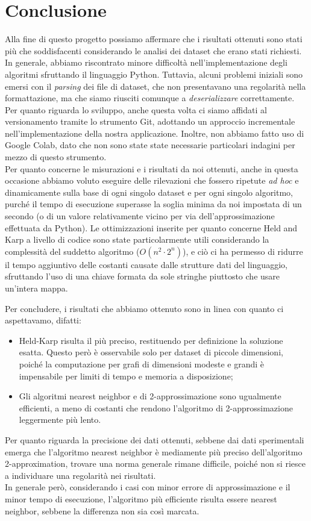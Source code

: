 \section{Conclusione}

Alla fine di questo progetto possiamo affermare che i risultati ottenuti sono stati più che soddisfacenti considerando le analisi dei dataset che erano stati richiesti. In generale, abbiamo riscontrato minore difficoltà nell'implementazione degli algoritmi sfruttando il linguaggio Python. Tuttavia, alcuni problemi iniziali sono emersi con il \textit{parsing} dei file di dataset, che non presentavano una regolarità nella formattazione, ma che siamo riusciti comunque a \textit{deserializzare} correttamente. \\ %
Per quanto riguarda lo sviluppo, anche questa volta ci siamo affidati al versionamento tramite lo strumento Git, adottando un approccio incrementale nell'implementazione della nostra applicazione. Inoltre, non abbiamo fatto uso di Google Colab, dato che non sono state state necessarie particolari indagini per mezzo di questo strumento. \\
Per quanto concerne le misurazioni e i risultati da noi ottenuti, anche in questa occasione abbiamo voluto eseguire delle rilevazioni che fossero ripetute \textit{ad hoc} e dinamicamente sulla base di ogni singolo dataset e per ogni singolo algoritmo, purché il tempo di esecuzione superasse la soglia minima da noi impostata di un secondo (o di un valore relativamente vicino per via dell'approssimazione effettuata da Python).
Le ottimizzazioni inserite per quanto concerne Held and Karp a livello di codice sono state particolarmente utili considerando la complessità del suddetto algoritmo (\(O(n^2\cdot2^n)\)), e ciò ci ha permesso di ridurre il tempo aggiuntivo delle costanti causate dalle strutture dati del linguaggio, sfruttando l'uso di una chiave formata da sole stringhe piuttosto che usare un'intera mappa. 

\noindent Per concludere, i risultati che abbiamo ottenuto sono in linea con quanto ci aspettavamo, difatti:
\begin{itemize}
  \item Held-Karp risulta il più preciso, restituendo per definizione la soluzione esatta. Questo però è osservabile solo per dataset di piccole dimensioni, poiché la computazione per grafi di dimensioni modeste e grandi è impensabile per limiti di tempo e memoria a disposizione;
  \item Gli algoritmi nearest neighbor e di 2-approssimazione sono ugualmente efficienti, a meno di costanti che rendono l'algoritmo di 2-approssimazione leggermente più lento.
\end{itemize}

Per quanto riguarda la precisione dei dati ottenuti, sebbene dai dati sperimentali emerga che l'algoritmo nearest neighbor è mediamente più preciso dell'algoritmo 2-approximation, trovare una norma generale rimane difficile, poiché non si riesce a individuare una regolarità nei risultati. \\
In generale però, considerando i casi con minor errore di approssimazione e il minor tempo di esecuzione, l'algoritmo più efficiente risulta essere nearest neighbor, sebbene la differenza non sia così marcata. 